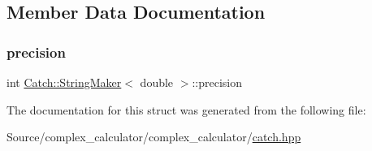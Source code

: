 \subsection{Member Data Documentation}
\mbox{\label{struct_catch_1_1_string_maker_3_01double_01_4_a15fa2b093c532ece7f1d0c713ebaee67}} 
\subsubsection{\texorpdfstring{precision}{precision}}
{\footnotesize\ttfamily int \mbox{\hyperlink{struct_catch_1_1_string_maker}{Catch\+::\+String\+Maker}}$<$ double $>$\+::precision\hspace{0.3cm}{\ttfamily [static]}}



The documentation for this struct was generated from the following file\+:\begin{DoxyCompactItemize}
\item 
Source/complex\+\_\+calculator/complex\+\_\+calculator/\mbox{\hyperlink{catch_8hpp}{catch.\+hpp}}\end{DoxyCompactItemize}

